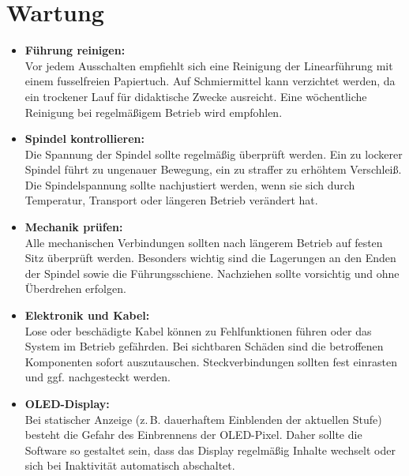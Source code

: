 \documentclass[a4paper,12pt]{report}
\begin{document}
	\chapter{Wartung}
	\begin{itemize}[leftmargin=1.5em]
		
		Der Demonstrator ist grundsätzlich wartungsarm. Dennoch sollten zur Sicherstellung der Lebensdauer und Funktionalität regelmäßig einige einfache Maßnahmen durchgeführt werden. \\[0.75cm]
		
		\textbf{Empfohlene Wartungsschritte:}
		
		\item \textbf{Führung reinigen:}  \\
		Vor jedem Ausschalten empfiehlt sich eine Reinigung der Linearführung mit einem fusselfreien Papiertuch. Auf Schmiermittel kann verzichtet werden, da ein trockener Lauf für didaktische Zwecke ausreicht. Eine wöchentliche Reinigung bei regelmäßigem Betrieb wird empfohlen.
		
		\item \textbf{Spindel kontrollieren:}  \\
		Die Spannung der Spindel sollte regelmäßig überprüft werden. Ein zu lockerer Spindel führt zu ungenauer Bewegung, ein zu straffer zu erhöhtem Verschleiß. Die Spindelspannung sollte nachjustiert werden, wenn sie sich durch Temperatur, Transport oder längeren Betrieb verändert hat. 
		
		\item \textbf{Mechanik prüfen:}  \\
		Alle mechanischen Verbindungen sollten nach längerem Betrieb auf festen Sitz überprüft werden. Besonders wichtig sind die Lagerungen an den Enden der Spindel sowie die Führungsschiene. Nachziehen sollte vorsichtig und ohne Überdrehen erfolgen.
		
		\item \textbf{Elektronik und Kabel:}  \\
		Lose oder beschädigte Kabel können zu Fehlfunktionen führen oder das System im Betrieb gefährden. Bei sichtbaren Schäden sind die betroffenen Komponenten sofort auszutauschen. Steckverbindungen sollten fest einrasten und ggf. nachgesteckt werden.
		
		\item \textbf{OLED-Display:}  \\
		Bei statischer Anzeige (z. B. dauerhaftem Einblenden der aktuellen Stufe) besteht die Gefahr des Einbrennens der OLED-Pixel. Daher sollte die Software so gestaltet sein, dass das Display regelmäßig Inhalte wechselt oder sich bei Inaktivität automatisch abschaltet. 
		
	\end{itemize}
	
\end{document}
